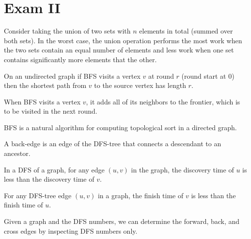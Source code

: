 \chapter{Exam II}

\begin{problem}


\asktf 

Consider taking the union of two sets with $n$ elements in total
(summed over both sets).  In the worst case, the union operation
performs the most work when the two sets contain an equal number of
elements and less work when one set contains significantly more
elements that the other.

\solt

\asktf

On an undirected graph if  BFS visits a vertex $v$ at round $r$ (round
start at $0$) then the shortest path from $v$ to the source vertex has
length $r$.

\solt


\asktf

When BFS visits a vertex $v$, it adds all of its neighbors to the
frontier, which is to be visited in the next round.

\solf

\asktf

BFS is a natural algorithm for computing topological sort in a directed graph.

\solf



\asktf
A back-edge is an edge of the DFS-tree that connects a descendant to
an ancestor.
\solf

\asktf 

In a DFS of a graph, for any edge $(u,v)$ in the graph, the discovery
time of $u$ is less than the discovery time of $v$.  

\solf


\asktf 
For any DFS-tree edge $(u,v)$ in a graph, the finish time of $v$ is
less than the finish time of $u$.  
\solt

\asktf 
Given a graph and the DFS numbers, we can determine the
forward, back, and cross edges by inspecting DFS numbers only.  
\solt


\end{problem}
